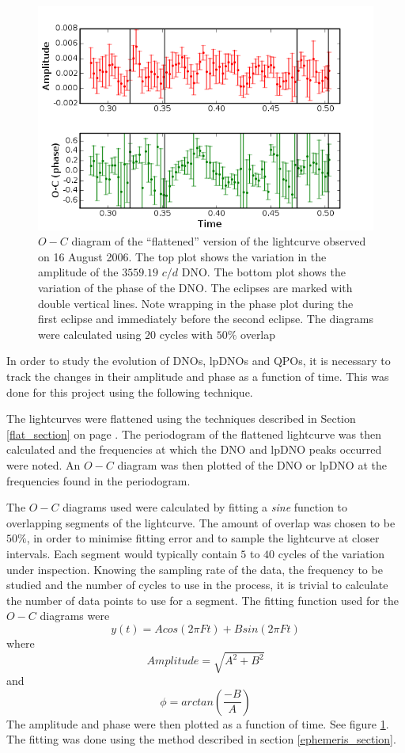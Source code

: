 \begin{figure}
\begin{center}
\includegraphics[width=0.85\columnwidth,bb=0 0 600 400]{images/ominc_example.png}
\caption[Example of $O-C$ diagram]{$O-C$ diagram of the ``flattened'' version of the lightcurve observed on 16 August 2006. The top plot shows the variation in the amplitude of the  $3559.19\hspace{4pt} c/d$ DNO. The bottom plot shows the variation of the phase of the DNO. The eclipses are marked with double vertical lines. Note wrapping in the phase plot during the first eclipse and immediately before the second eclipse. The diagrams were calculated using $20$ cycles with $50\%$ overlap }
\label{omincexample}
\end{center}
\end{figure}


In order to study the evolution of DNOs, lpDNOs and QPOs, it is necessary to track the changes in their amplitude and phase as a function of time. This was done for this project using the following technique.

The lightcurves were flattened using the techniques described in Section \ref{flat_section} on page \pageref{flat_section}. The periodogram of the flattened lightcurve was then calculated and the frequencies at which the DNO and lpDNO peaks occurred were noted. An $O-C$ diagram was then plotted of the DNO or lpDNO at the frequencies found in the periodogram.

The $O-C$ diagrams used were calculated by fitting a \textit{sine} function to overlapping segments of the lightcurve. The amount of overlap was chosen to be $50\%$, in order to minimise fitting error and to sample the lightcurve at closer intervals. Each segment would typically contain $5$ to $40$ cycles of the variation under inspection. Knowing the sampling rate of the data, the frequency to be studied and the number of cycles to use in the process, it is trivial to calculate the number of data points to use for a segment. The fitting function used for the $O-C$ diagrams were $$y(t) = Acos(2\pi Ft) + Bsin(2\pi Ft)$$ where $$Amplitude =\sqrt{A^{2} + B^{2}} $$ and $$ \phi = arctan(\frac{-B}{A}) $$
The amplitude and phase were then plotted as a function of time. See figure \ref{omincexample}. The fitting was done using the method described in section \ref{ephemeris_section}.

